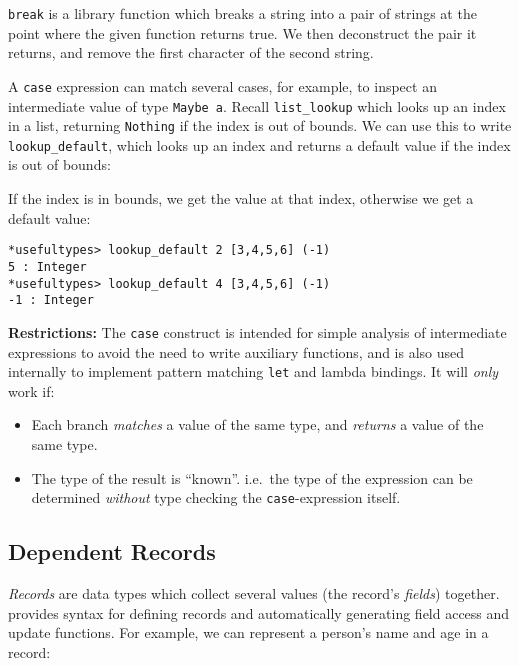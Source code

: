 
\noindent
\texttt{break} is a library function which breaks a string into a pair of strings
at the point where the given function returns true.
We then deconstruct the pair it returns, and remove the first character of the second string.

A \texttt{case} expression can match several cases, for example, to inspect an intermediate value of type \texttt{Maybe a}.
Recall \texttt{list\_lookup} which looks up an index in a list, returning \texttt{Nothing} if the index is out
of bounds.
We can use this to write \texttt{lookup\_default}, which looks up an index and returns a default value if the index is out of bounds:


\noindent
If the index is in bounds, we get the value at that index, otherwise we get a default value:

\begin{lstlisting}[style=stdout]
*usefultypes> lookup_default 2 [3,4,5,6] (-1)
5 : Integer
*usefultypes> lookup_default 4 [3,4,5,6] (-1)
-1 : Integer
\end{lstlisting}


\noindent
\textbf{Restrictions:} The \texttt{case} construct is intended for simple analysis of intermediate expressions to avoid the need to write auxiliary functions, and is also used internally to implement pattern matching \texttt{let} and lambda bindings.
It will \emph{only} work if:

\begin{itemize}
\item Each branch \emph{matches} a value of the same type, and \emph{returns} a value of the same type.
\item The type of the result is ``known''. i.e.\ the type of the expression can be determined \emph{without} type checking the \texttt{case}-expression itself.
\end{itemize}

\subsection{Dependent Records}

\emph{Records} are data types which collect several values (the record's \emph{fields}) together.
\Idris{} provides syntax for defining records and automatically generating field access and update functions.
For example, we can represent a person's name and age in a record:

